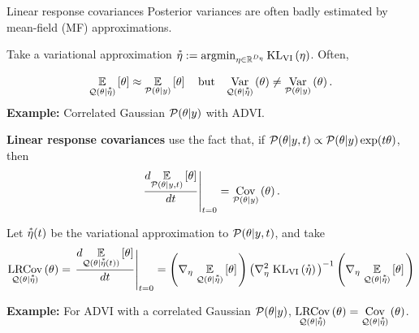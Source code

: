 \documentclass[8pt]{beamer}\usepackage[]{graphicx}\usepackage[]{color}
\begin{document}
\begin{frame}{Linear response covariances}
%
Posterior variances are often badly estimated by mean-field (MF) approximations.

Take a variational approximation 
$\accentset{*}{\eta} := \operatorname*{\mathrm{argmin}}_{\eta \in \mathbb{R}^{D_{\eta}}} \mathrm{KL}_{\mathrm{VI}}\left(\eta\right)$.  Often,

\begin{align}\label{eq:mfvb_conceit}
    \underset{\mathcal{Q}(\theta \vert \accentset{*}{\eta})}{\mathbb{E}}\left[\theta\right] \approx
    \underset{\mathcal{P}(\theta \vert y)}{\mathbb{E}}\left[\theta\right] \quad\textrm{but}\quad
    \underset{\mathcal{Q}(\theta \vert \accentset{*}{\eta})}{\mathrm{Var}}\left(\theta\right) \ne
    \underset{\mathcal{P}(\theta \vert y)}{\mathrm{Var}}\left(\theta\right).
\end{align}    
%
\textbf{Example: }Correlated Gaussian $\mathcal{P}(\theta \vert y)$ with ADVI.

\hrulefill

\textbf{Linear response covariances} use the fact that, if
$\mathcal{P}(\theta \vert y, t) \propto \mathcal{P}(\theta \vert y) \exp(t \theta)$, then
%
\begin{align}\label{eq:deriv_is_cov}
    \left. \frac{d \underset{\mathcal{P}(\theta \vert y, t)}{\mathbb{E}}\left[\theta\right]}{dt} \right|_{t=0} = \underset{\mathcal{P}(\theta \vert y)}{\mathrm{Cov}}\left(\theta\right).
\end{align}

Let $\accentset{*}{\eta}(t)$ be the variational approximation to $\mathcal{P}(\theta \vert y, t)$, and
take
%
\begin{align*}
    \underset{\mathcal{Q}(\theta \vert \accentset{*}{\eta})}{\mathrm{LRCov}}\left(\theta\right)
    =
    \left. \frac{d \underset{\mathcal{Q}(\theta \vert \accentset{*}{\eta}(t))}{\mathbb{E}}\left[\theta\right]}{dt} \right|_{t=0}
    =
    \left( \nabla_{\eta} \left. \underset{\mathcal{Q}(\theta \vert \accentset{*}{\eta})}{\mathbb{E}}\left[\theta\right] \right.\right)
    \left(\nabla^2_{\eta} \left. \mathrm{KL}_{\mathrm{VI}}\left(\accentset{*}{\eta}\right) \right. \right)^{-1}
    \left( \nabla_{\eta} \left. \underset{\mathcal{Q}(\theta \vert \accentset{*}{\eta})}{\mathbb{E}}\left[\theta\right] \right.\right)
\end{align*}
%

\textbf{Example: } For ADVI with a correlated Gaussian $\mathcal{P}(\theta \vert y)$,
$\underset{\mathcal{Q}(\theta \vert \accentset{*}{\eta})}{\mathrm{LRCov}}\left(\theta\right)  = \underset{\mathcal{Q}(\theta \vert \accentset{*}{\eta})}{\mathrm{Cov}}\left(\theta\right)$.


\end{frame}



\begin{frame}
\end{frame}
\end{document}
